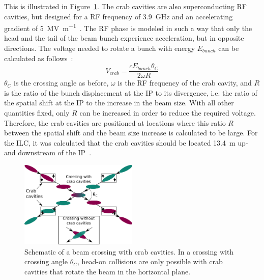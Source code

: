 This is illustrated in Figure~\ref{fig:Crab_crossing}.
The crab cavities are also superconducting RF cavities, but designed for a RF frequency of \SI{3.9}{\giga\hertz} and an accelerating gradient of \SI{5}{\mega\volt\per\meter}~\cite[p. 154]{TDR32}.
The RF phase is modeled in such a way that only the head and the tail of the beam bunch experience acceleration, but in opposite directions.
The voltage needed to rotate a bunch with energy $E_{bunch}$ can be calculated as follows~\cite{Crab_cavities}:
\begin{equation}
 V_{crab}=\frac{cE_{bunch}\theta_C}{2\omega R}
\end{equation}
$\theta_C$ is the crossing angle as before, $\omega$ is the RF frequency of the crab cavity, and $R$ is the ratio of the bunch displacement at the IP to its divergence, i.e. the ratio of the spatial shift at the IP to the increase in the beam size.
With all other quantities fixed, only $R$ can be increased in order to reduce the required voltage.
Therefore, the crab cavities are positioned at locations where this ratio $R$ between the spatial shift and the beam size increase is calculated to be large.
For the ILC, it was calculated that the crab cavities should be located \SI{13.4}{\meter} up- and downstream of the IP~\cite[p. 154]{TDR32}.
\begin{figure}
\centering
\includegraphics[width=0.5\textwidth]{Figures/Crab_crossing.png}
\caption[Schematic of a beam crossing with crab cavities]{Schematic of a beam crossing with crab cavities. In a crossing with crossing angle $\theta_C$, head-on collisions are only possible with crab cavities that rotate the beam in the horizontal plane.}
\label{fig:Crab_crossing}
\end{figure}

